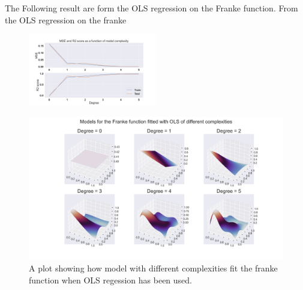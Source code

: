 \thispagestyle{plain}
The Following result are form the OLS regression on the Franke function. 
From the OLS regression on the franke 
\begin{figure}[h]
	\centering
	\includegraphics[width=0.5\textwidth]{Figure_3.png}
	\caption{}
\end{figure}

\begin{figure}[h]
	\centering
	\includegraphics[width=\textwidth]{Figure_2.png}
	\caption{A plot showing how model with different complexities fit the franke function when OLS regession has been used.}
	\label{OLS figure}
\end{figure}


